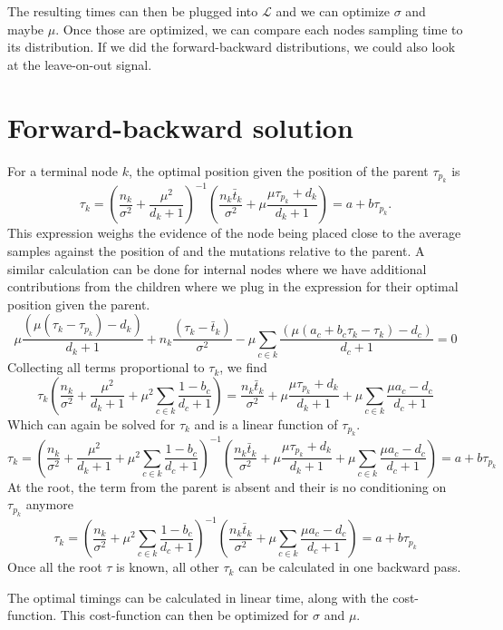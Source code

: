 \documentclass[aps,rmp, onecolumn]{revtex4}
\newcommand{\LH}{\mathcal{L}}
\begin{document}
The resulting times can then be plugged into $\LH$ and we can optimize $\sigma$ and maybe $\mu$.
Once those are optimized, we can compare each nodes sampling time to its distribution.
If we did the forward-backward distributions, we could also look at the leave-on-out signal.

\section*{Forward-backward solution}
For a terminal node $k$, the optimal position given the position of the parent $\tau_{p_k}$ is
\begin{equation}
\tau_k =  \left(\frac{n_k}{\sigma^2} + \frac{\mu^2}{d_k+1}\right)^{-1}\left(\frac{n_k \bar{t}_k}{\sigma^2} + \mu\frac{\mu\tau_{p_k} + d_k}{d_k+1}\right) = a + b\tau_{p_k}.
\end{equation}
This expression weighs the evidence of the node being placed close to the average samples against the position of and the mutations relative to the parent.
A similar calculation can be done for internal nodes where we have additional contributions from the children where we plug in the expression for their optimal position given the parent.
\begin{equation}
    \mu\frac{(\mu(\tau_k - \tau_{p_k}) -  d_k)}{d_k+1} +  n_k\frac{(\tau_k-\bar{t}_k)}{\sigma^2} -  \mu\sum_{c\in k} \frac{(\mu(a_c + b_c \tau_{k} - \tau_{k}) - d_c)}{d_c+1} = 0
\end{equation}
Collecting all terms proportional to $\tau_k$, we find
\begin{equation}
\tau_k\left(\frac{n_k}{\sigma^2} + \frac{\mu^2}{d_k+1} + \mu^2\sum_{c\in k} \frac{1-b_c}{d_c+1}\right) =
\frac{n_k \bar{t}_k}{\sigma^2} + \mu\frac{\mu\tau_{p_k} + d_k}{d_k+1} + \mu \sum_{c\in k}\frac{\mu a_c - d_c}{d_c+1}
\end{equation}
Which can again be solved for $\tau_k$ and is a linear function of $\tau_{p_k}$.
\begin{equation}
    \tau_k =\left(\frac{n_k}{\sigma^2} + \frac{\mu^2}{d_k+1} + \mu^2\sum_{c\in k} \frac{1-b_c}{d_c+1}\right)^{-1}\left(
    \frac{n_k \bar{t}_k}{\sigma^2} + \mu\frac{\mu\tau_{p_k} + d_k}{d_k+1} + \mu \sum_{c\in k}\frac{\mu a_c - d_c}{d_c+1}\right) = a + b \tau_{p_k}
\end{equation}
At the root, the term from the parent is absent and their is no conditioning on $\tau_{p_k}$ anymore
\begin{equation}
    \tau_k =\left(\frac{n_k}{\sigma^2} + \mu^2\sum_{c\in k} \frac{1-b_c}{d_c+1}\right)^{-1}\left(
    \frac{n_k \bar{t}_k}{\sigma^2} + \mu \sum_{c\in k}\frac{\mu a_c - d_c}{d_c+1}\right) = a + b \tau_{p_k}
\end{equation}
Once all the root $\tau$ is known, all other $\tau_k$ can be calculated in one backward pass.

The optimal timings can be calculated in linear time, along with the cost-function. This cost-function can then be optimized for $\sigma$ and $\mu$.
\end{document}
